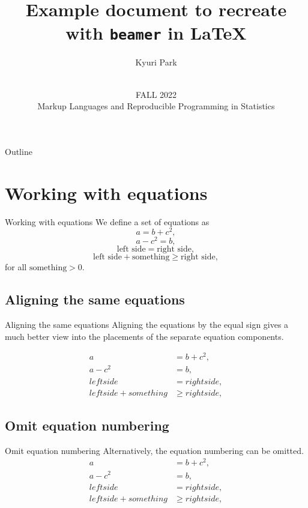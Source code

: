 \documentclass[aspectratio=169]{beamer}
\title{Example document to recreate with \texttt{beamer} in \LaTeX}
\author{Kyuri Park}
\date{\vspace{.5 in}\\ FALL 2022 \\ Markup Languages and Reproducible Programming in Statistics}
\begin{document}
\maketitle %
\begin{frame}{Outline}
  \tableofcontents
\end{frame}
\section{Working with equations} 
\begin{frame}{Working with equations}
We define a set of equations as 
\begin{equation}
    a=b+c^2,
\end{equation}
\begin{equation}
	a-c^2=b,
\end{equation}
\begin{equation}
	\text{left side} = \text{right side},
\end{equation}
\begin{equation}
	\text{left side} + \text{something} \geq \text{right side},
\end{equation}
for all $\text{something} > 0$. 
\end{frame}
\subsection{Aligning the same equations}
\begin{frame}{Aligning the same equations}
Aligning the equations by the equal sign gives a much better view into the placements of the separate equation components.

\begin{align}
a &= b + c^2 , \\
a - c^2 &= b,  \\
left side &= right side, \\
left side + something &\geq right side, 
\end{align}

\end{frame}
\subsection{Omit equation numbering}
\begin{frame}{Omit equation numbering}
Alternatively, the equation numbering can be omitted.
\begin{align*}
a &= b + c^2 , \\
a - c^2 &= b,  \\
left side &= right side, \\
left side + something &\geq right side, 
\end{align*}
\end{frame}
\end{document}
